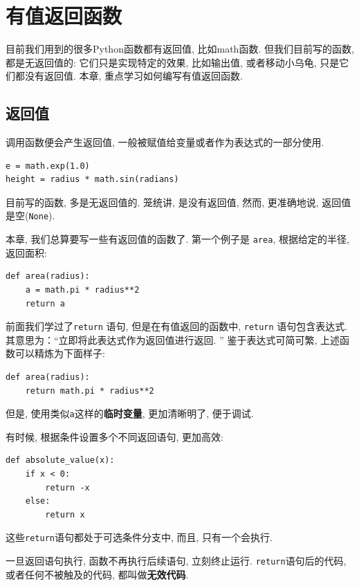 \documentclass[10pt]{book}
\begin{document}
\chapter{有值返回函数}
\label{fruitchap}

目前我们用到的很多Python函数都有返回值, 比如math函数. 
但我们目前写的函数, 都是无返回值的: 它们只是实现特定的效果, 比如输出值, 
或者移动小乌龟, 只是它们都没有返回值. 
本章, 重点学习如何编写有值返回函数. 

\section{返回值}

调用函数便会产生返回值, 一般被赋值给变量或者作为表达式的一部分使用. 

\begin{verbatim}
e = math.exp(1.0)
height = radius * math.sin(radians)
\end{verbatim}
%
目前写的函数, 多是无返回值的. 笼统讲, 是没有返回值, 然而, 
更准确地说, 返回值是空({\tt None}).

本章, 我们总算要写一些有返回值的函数了. 
第一个例子是 {\tt area}, 根据给定的半径, 返回面积:

\begin{verbatim}
def area(radius):
    a = math.pi * radius**2
    return a
\end{verbatim}
%
前面我们学过了{\tt return} 语句, 但是在有值返回的函数中, 
{\tt return} 语句包含表达式. 
其意思为：``立即将此表达式作为返回值进行返回. ''
鉴于表达式可简可繁, 上述函数可以精炼为下面样子:

\begin{verbatim}
def area(radius):
    return math.pi * radius**2
\end{verbatim}
%
但是, 使用类似{\tt a}这样的{\bf 临时变量}, 更加清晰明了, 便于调试. 

有时候, 根据条件设置多个不同返回语句, 更加高效:

\begin{verbatim}
def absolute_value(x):
    if x < 0:
        return -x
    else:
        return x
\end{verbatim}
%
这些{\tt return}语句都处于可选条件分支中, 而且, 只有一个会执行. 

一旦返回语句执行, 函数不再执行后续语句, 立刻终止运行. 
{\tt return}语句后的代码, 或者任何不被触及的代码, 都叫做{\bf 无效代码}.
\end{document}
